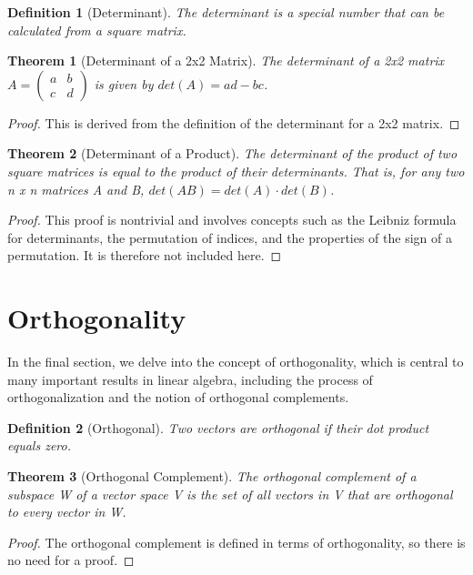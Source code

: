 \documentclass{article}
\newtheorem{definition}{Definition}[section]
\newtheorem{theorem}{Theorem}[section]
\begin{document}
\begin{definition}[Determinant]
The determinant is a special number that can be calculated from a square matrix.
\end{definition}

\begin{theorem}[Determinant of a 2x2 Matrix]
The determinant of a 2x2 matrix $A = \begin{pmatrix} a & b \\ c & d \end{pmatrix}$ is given by $det(A) = ad - bc$.
\end{theorem}

\begin{proof}
This is derived from the definition of the determinant for a 2x2 matrix.
\end{proof}

\begin{theorem}[Determinant of a Product]
The determinant of the product of two square matrices is equal to the product of their determinants. That is, for any two n x n matrices A and B, $det(AB) = det(A) \cdot det(B)$.
\end{theorem}

\begin{proof}
This proof is nontrivial and involves concepts such as the Leibniz formula for determinants, the permutation of indices, and the properties of the sign of a permutation. It is therefore not included here.
\end{proof}

\section{Orthogonality}
In the final section, we delve into the concept of orthogonality, which is central to many important results in linear algebra, including the process of orthogonalization and the notion of orthogonal complements.

\begin{definition}[Orthogonal]
Two vectors are orthogonal if their dot product equals zero.
\end{definition}

\begin{theorem}[Orthogonal Complement]
The orthogonal complement of a subspace W of a vector space V is the set of all vectors in V that are orthogonal to every vector in W.
\end{theorem}

\begin{proof}
The orthogonal complement is defined in terms of orthogonality, so there is no need for a proof.
\end{proof}
\end{document}
